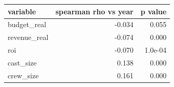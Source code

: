 \begin{tabular}{lrr}
\toprule
variable & spearman rho vs year & p value \\
\midrule
budget\_real & -0.034 & 0.055 \\
revenue\_real & -0.074 & 0.000 \\
roi & -0.070 & 1.0e-04 \\
cast\_size & 0.138 & 0.000 \\
crew\_size & 0.161 & 0.000 \\
\bottomrule
\end{tabular}